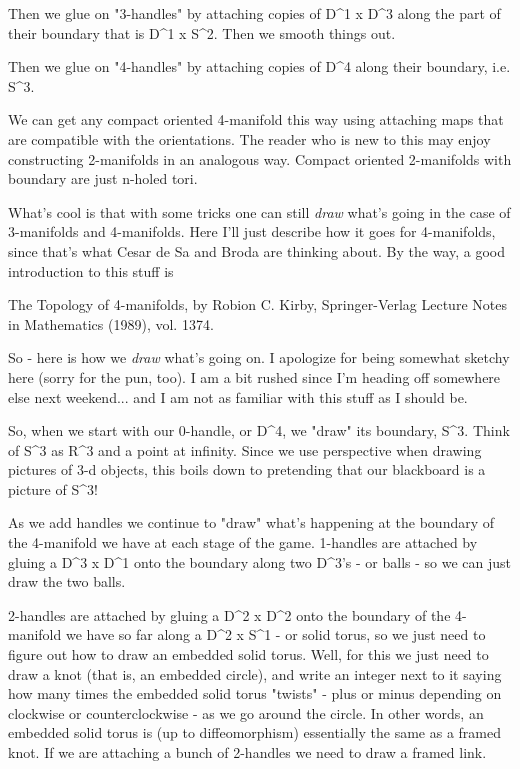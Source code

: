 Then we glue on "3-handles" by attaching copies of D^1 x D^3 along the
part of their boundary that is D^1 x S^2.  Then we smooth things out.

Then we glue on "4-handles" by attaching copies of D^4 along their
boundary, i.e. S^3.

We can get any compact oriented 4-manifold this way using attaching maps
that are compatible with the orientations.  The reader who is new to this
may enjoy constructing 2-manifolds in an analogous way.  Compact
oriented 2-manifolds with boundary are just n-holed tori.

What's cool is that with some tricks one can still \emph{draw} what's going in
the case of 3-manifolds and 4-manifolds.  Here I'll just describe how it
goes for 4-manifolds, since that's what Cesar de Sa and Broda are
thinking about.  By the way, a good introduction to this stuff is 

The Topology of 4-manifolds, by Robion C. Kirby, Springer-Verlag
Lecture Notes in Mathematics (1989), vol. 1374.

So - here is how we \emph{draw} what's going on.  I apologize for being
somewhat sketchy here (sorry for the pun, too).  I am a bit
rushed since I'm heading off somewhere else next weekend... and I am not
as familiar with this stuff as I should be.

So, when we start with our 0-handle, or D^4, we "draw" its boundary,
S^3.  Think of S^3 as R^3 and a point at infinity.  Since we use perspective
when drawing pictures of 3-d objects, this boils down to pretending that
our blackboard is a picture of S^3!  

As we add handles we continue to "draw" what's happening at the
boundary of the 4-manifold we have at each stage of the game.  1-handles
are attached by gluing a D^3 x D^1 onto the boundary along two D^3's -
or balls - so we can just draw the two balls. 

2-handles are attached by gluing a D^2 x D^2 onto the boundary of the
4-manifold we have so far along a D^2 x S^1 - or solid torus, so we just
need to figure out how to draw an embedded solid torus.   Well, for this
we just need to draw a knot (that is, an embedded circle), and write an
integer next to it saying how many times the embedded solid torus
"twists" - plus or minus depending on clockwise or counterclockwise - as
we go around the circle.  In other words, an embedded solid torus is (up
to diffeomorphism) essentially the same as a framed knot.  If we are
attaching a bunch of 2-handles we need to draw a framed link.

